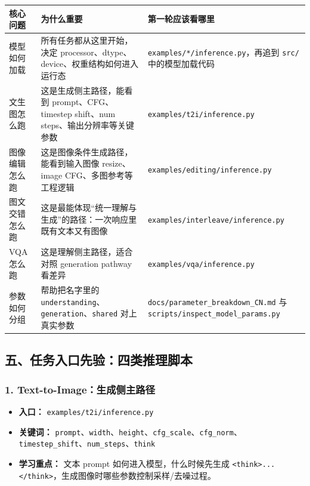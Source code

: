 \begin{center}
{\small
\begin{tabular}{p{3.5cm}p{4.7cm}p{5.0cm}}
\hline
\textbf{核心问题} & \textbf{为什么重要} & \textbf{第一轮应该看哪里} \\
\hline
模型如何加载 & 所有任务都从这里开始，决定 processor、dtype、device、权重结构如何进入运行态 & \texttt{examples/*/inference.py}，再追到 \texttt{src/} 中的模型加载代码 \\
文生图怎么跑 & 这是生成侧主路径，能看到 prompt、CFG、timestep shift、num steps、输出分辨率等关键参数 & \texttt{examples/t2i/inference.py} \\
图像编辑怎么跑 & 这是图像条件生成路径，能看到输入图像 resize、image CFG、多图参考等工程逻辑 & \texttt{examples/editing/inference.py} \\
图文交错怎么跑 & 这是最能体现“统一理解与生成”的路径：一次响应里既有文本又有图像 & \texttt{examples/interleave/inference.py} \\
VQA 怎么跑 & 这是理解侧主路径，适合对照 generation pathway 看差异 & \texttt{examples/vqa/inference.py} \\
参数如何分组 & 帮助把名字里的 \texttt{understanding}、\texttt{generation}、\texttt{shared} 对上真实参数 & \texttt{docs/parameter\_breakdown\_CN.md} 与 \texttt{scripts/inspect\_model\_params.py} \\
\hline
\end{tabular}
}
\end{center}

\subsection{五、任务入口先验：四类推理脚本}

\subsubsection*{1. Text-to-Image：生成侧主路径}

\begin{itemize}[leftmargin=1.5em]
  \item \textbf{入口：} \texttt{examples/t2i/inference.py}
  \item \textbf{关键词：} \texttt{prompt}、\texttt{width}、\texttt{height}、\texttt{cfg\_scale}、\texttt{cfg\_norm}、\texttt{timestep\_shift}、\texttt{num\_steps}、\texttt{think}
  \item \textbf{学习重点：} 文本 prompt 如何进入模型，什么时候先生成 \texttt{<think>...</think>}，生成图像时哪些参数控制采样/去噪过程。
\end{itemize}

